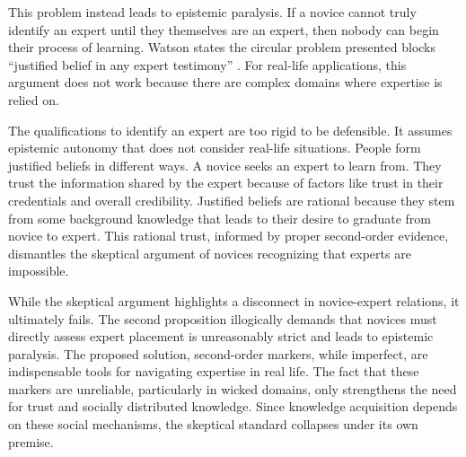 This problem instead leads to epistemic paralysis. If a novice cannot truly identify an expert until they themselves are an expert, then nobody can begin their process of learning. Watson states the circular problem presented blocks “justified belief in any expert testimony” \autocite[p.\ 138]{watson2022fixing}. For real-life applications, this argument does not work because there are complex domains where expertise is relied on.

The qualifications to identify an expert are too rigid to be defensible. It assumes epistemic autonomy that does not consider real-life situations. People form justified beliefs in different ways. A novice seeks an expert to learn from. They trust the information shared by the expert because of factors like trust in their credentials and overall credibility. Justified beliefs are rational because they stem from some background knowledge that leads to their desire to graduate from novice to expert. This rational trust, informed by proper second-order evidence, dismantles the skeptical argument of novices recognizing that experts are impossible.

While the skeptical argument highlights a disconnect in novice-expert relations, it ultimately fails. The second proposition illogically demands that novices must directly assess expert placement is unreasonably strict and leads to epistemic paralysis. The proposed solution, second-order markers, while imperfect, are indispensable tools for navigating expertise in real life. The fact that these markers are unreliable, particularly in wicked domains, only strengthens the need for trust and socially distributed knowledge. Since knowledge acquisition depends on these social mechanisms, the skeptical standard collapses under its own premise.


